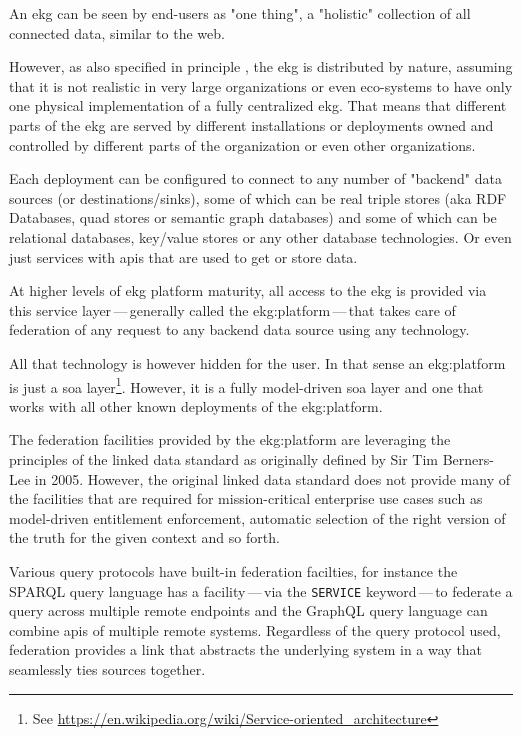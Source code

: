 %
%
An \gls{ekg} can be seen by end-users as "one thing",
a "holistic" collection of all connected data, similar to the web.

However, as also specified in principle , the \gls{ekg} is distributed by
nature, assuming that it is not realistic in very large organizations or even eco-systems to have only one physical
implementation of a fully centralized \gls{ekg}.
That means that different parts of the \gls{ekg} are served by different installations or
deployments owned and controlled by different parts of the organization or even other organizations.

Each deployment can be configured to connect to any number of "backend" data sources
(or destinations/sinks), some of which can be real triple stores (aka RDF Databases, quad stores or semantic graph databases)
and some of which can be relational databases, key/value stores or any other database technologies.
Or even just services with \glspl{api} that are used to get or store data.

At higher levels of \gls{ekg} platform maturity, all access to the \gls{ekg} is provided via this service layer\,---\,generally
called the \gls{ekg:platform}\,---\,that takes care of federation of any request to any backend data source using any technology.

All that technology is however hidden for the user.
In that sense an \gls{ekg:platform} is just a \gls{soa} layer\footnote{See \url{https://en.wikipedia.org/wiki/Service-oriented_architecture}}.
However, it is a fully model-driven \gls{soa} layer and one that works with all other known deployments of the \gls{ekg:platform}.

The federation facilities provided by the \gls{ekg:platform} are leveraging the principles of the linked data standard\cite{linked-data}
as originally defined by Sir Tim Berners-Lee in 2005.
However, the original linked data standard does not provide many of the facilities that are required for mission-critical
enterprise use cases such as model-driven entitlement enforcement, automatic selection of the right version of the truth
for the given context and so forth.

Various query protocols have built-in federation facilties, for instance the SPARQL query language has a
facility\,---\,via the \lstinline|SERVICE| keyword\,---\,to federate a query across multiple remote endpoints and
the GraphQL query language can combine \glspl{api} of multiple remote systems.
Regardless of the query protocol used, federation provides a link that abstracts the underlying system in a
way that seamlessly ties sources together.

